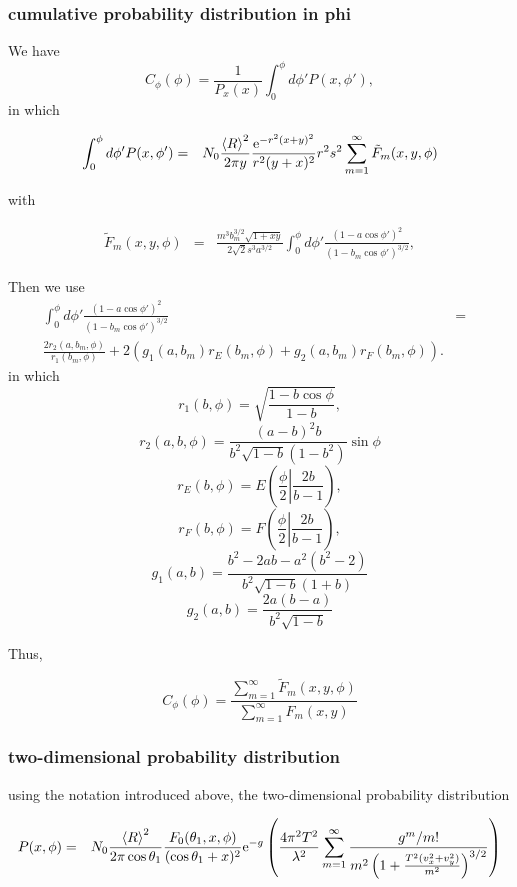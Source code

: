\documentclass[11pt,openany]{report}
\newcommand{\e}{{\rm e}}
\begin{document}
{{%
\subsubsection{cumulative probability distribution in phi}

We have
$$C_{\phi}(\phi)=\frac{1}{P_x(x)}\int_{0}^{\phi}d\phi'P(x,\phi'),$$
in which


\begin{eqnarray}
\int_{0}^{\phi}d\phi'P(x,\phi')&=&N_{0}\frac{\left<R\right>^{2}}{2\pi y}\frac{\e^{-r^{2}(x+y)^{2}}}{r^{2}(y+x)^{2}}
r^{2}s^{2}
\sum_{m=1}^{\infty}\tilde {F}_{m}(x,y,\phi)
\end{eqnarray}

with

\begin{eqnarray} \tilde F_{m}(x,y,\phi)&=&\frac{m^{3}b_{m}^{3/2}\sqrt{1+xy}}{2\sqrt{2}s^{3}a^{3/2}}\int_{0}^{\phi}d\phi'\frac{\left(1-a\cos\phi'\right)^{2}}{(1-b_m\cos\phi')^{3/2}},
\end{eqnarray}


Then we use
\begin{eqnarray}
\int_{0}^{\phi}d\phi'\frac{\left(1-a\cos\phi' \right)^{2}}{(1-b_m\cos\phi')^{3/2}}&=&\\
\frac{2r_{2}(a,b_m,\phi)}{r_{1}(b_m,\phi)}+2(g_{1}(a,b_m)r_{E}(b_m,\phi)+g_{2}(a,b_m)r_{F}(b_m,\phi)).
\end{eqnarray}
in which
$$r_{1}(b,\phi)=\sqrt{\frac{1-b\cos\phi}{1-b}},$$
$$r_{2}(a,b,\phi)=\frac{(a-b)^{2}b}{b^{2}\sqrt{1-b}(1-b^{2})}\sin\phi$$
$$r_{E}(b,\phi)=E\left(\frac{\phi}{2}\left|\frac{2b}{b-1}\right.\right),$$
$$r_{F}(b,\phi)=F\left(\frac{\phi}{2}\left|\frac{2b}{b-1}\right.\right),$$
$$g_{1}(a,b)=\frac{b^{2}-2ab-a^{2}(b^{2}-2)}{b^{2}\sqrt{1-b}(1+b)}$$
$$g_{2}(a,b)=\frac{2a(b-a)}{b^{2}\sqrt{1-b}}$$

Thus,

$$C_{\phi}(\phi)=\frac{\sum_{m=1}^{\infty} \tilde F_{m}(x,y,\phi)}{\sum_{m=1}^{\infty} F_{m}(x,y)}$$

\subsubsection{two-dimensional probability distribution}

using the notation introduced above, the two-dimensional probability distribution

\begin{eqnarray}
P(x,\phi)&=&N_{0}\frac{\left<R\right>^{2}}{2\pi\cos\theta_{1}}\frac{F_{0}(\theta_{1},x,\phi)}{(\cos{\theta_{1}}+x)^{2}}
\e^{-g}\left(\frac{4\pi^{2}T^{2}}{\lambda^{2}}\sum_{m=1}^{\infty}\frac{g^{m}/m!}{m^{2}\left(1+\frac{T^{2}(v_{x}^{2}+v_{y}^{2})}{m^{2}}\right)^{3/2}}\right)\end{eqnarray}


}}
\end{document}
